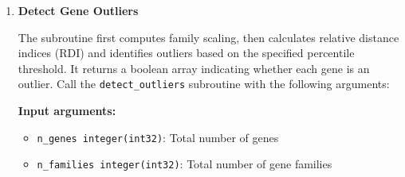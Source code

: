 \documentclass[11pt]{article}
\begin{document}
\begin{enumerate}
\begin{enumerate}
\begin{enumerate}
	      	      	      \textbf{Input arguments:}
	      	      	      \begin{itemize}
	      	      	      	\item \texttt{vec1 real(real64):} First expression vector as
	      	      	      	      array with length of dimension \texttt{d}
	      	      	      	      
	      	      	      	\item \texttt{vec2 real(real64):} Second expression vector as
	      	      	      	      array with length of dimension \texttt{d}
	      	      	      	      
	      	      	      	\item \texttt{d integer(int32):} Dimension value
	      	      	      \end{itemize}
	      	      	      
	      	      	      \textbf{Output arguments:}
	      	      	      \begin{itemize}
	      	      	      	\item \texttt{result real(real64):} Euclidean distance value
	      	      	      	      between \texttt{vec1} and \texttt{vec2}
	      	      	      \end{itemize}
	      	      	      \begin{lstlisting}[language=Fortran, caption={Euclidean distance calculation}]
call euclidean_distance(vec1, vec2, d, result)
	      	      	      \end{lstlisting}
	      	      \end{enumerate}
	      	      
	      	\item \textbf{Detect Gene Outliers}
	      	      
	      	      The subroutine first computes family scaling, then calculates relative
	      	      distance indices (RDI) and identifies outliers based on the specified
	      	      percentile threshold. It returns a boolean array indicating whether each
	      	      gene is an outlier. Call the \texttt{detect\_outliers} subroutine with
	      	      the following arguments:
	      	      
	      	      \textbf{Input arguments:}
	      	      \begin{itemize}
	      	      	\item \texttt{n\_genes integer(int32)}: Total number of genes
	      	      	      
	      	      	\item \texttt{n\_families integer(int32)}: Total number of gene families
	      	      	      

\end{itemize}
\end{enumerate}
\end{enumerate}
\end{document}
